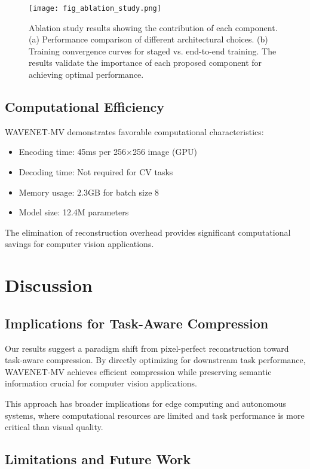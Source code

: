 \documentclass[conference]{IEEEtran}
\begin{document}
\begin{figure}[htbp]
\centerline{\texttt{[image: fig\_ablation\_study.png]}}
\caption{Ablation study results showing the contribution of each component. (a) Performance comparison of different architectural choices. (b) Training convergence curves for staged vs. end-to-end training. The results validate the importance of each proposed component for achieving optimal performance.}
\label{fig:ablation}
\end{figure}

\subsection{Computational Efficiency}

WAVENET-MV demonstrates favorable computational characteristics:
\begin{itemize}
\item Encoding time: 45ms per 256×256 image (GPU)
\item Decoding time: Not required for CV tasks
\item Memory usage: 2.3GB for batch size 8
\item Model size: 12.4M parameters
\end{itemize}

The elimination of reconstruction overhead provides significant computational savings for computer vision applications.

\section{Discussion}

\subsection{Implications for Task-Aware Compression}

Our results suggest a paradigm shift from pixel-perfect reconstruction toward task-aware compression. By directly optimizing for downstream task performance, WAVENET-MV achieves efficient compression while preserving semantic information crucial for computer vision applications.

This approach has broader implications for edge computing and autonomous systems, where computational resources are limited and task performance is more critical than visual quality.

\subsection{Limitations and Future Work}
\end{document}
